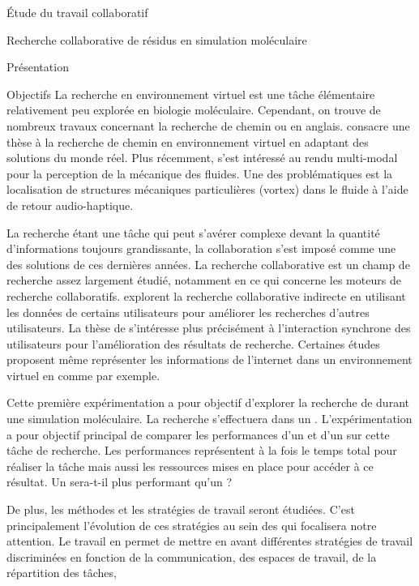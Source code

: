 \documentclass[myfrancais]{mythesis}
\begin{document}
\begin{mypart}{Étude du travail collaboratif}
\begin{mychapter}{Recherche collaborative de résidus en simulation moléculaire}
\begin{mysection}{Présentation}
\begin{mysubsection}{Objectifs}
					La recherche en environnement virtuel est une tâche élémentaire relativement peu explorée en biologie moléculaire.
					Cependant, on trouve de nombreux travaux concernant la \og recherche de chemin \fg ou  en anglais.
					 consacre une thèse à la recherche de chemin en environnement virtuel en adaptant des solutions du monde réel.
					Plus récemment,  s'est intéressé au rendu multi-modal pour la perception de la mécanique des fluides.
					Une des problématiques est la localisation de structures mécaniques particulières (vortex) dans le fluide à l'aide de retour audio-haptique.

					La recherche étant une tâche qui peut s'avérer complexe devant la quantité d'informations toujours grandissante, la collaboration s'est imposé comme une des solutions de ces dernières années.
					La recherche collaborative est un champ de recherche assez largement étudié, notamment en ce qui concerne les moteurs de recherche collaboratifs.
					 explorent la recherche collaborative indirecte en utilisant les données de certains utilisateurs pour améliorer les recherches d'autres utilisateurs.
					La thèse de  s'intéresse plus précisément à l'interaction synchrone des utilisateurs pour l'amélioration des résultats de recherche.
					Certaines études proposent même représenter les informations de l'internet dans un environnement virtuel en \myThreeD comme  par exemple.

					Cette première expérimentation a pour objectif d'explorer la recherche de  durant une simulation moléculaire.
					La recherche s'effectuera dans un .
					L'expérimentation a pour objectif principal de comparer les performances d'un  et d'un  sur cette tâche de recherche.
					Les performances représentent à la fois le temps total pour réaliser la tâche mais aussi les ressources mises en place pour accéder à ce résultat.
					Un  sera-t-il plus performant qu'un  ?

					De plus, les méthodes et les stratégies de travail seront étudiées.
					C'est principalement l'évolution de ces stratégies au sein des  qui focalisera notre attention.
					Le travail en  permet de mettre en avant différentes stratégies de travail discriminées en fonction de la communication, des espaces de travail, de la répartition des tâches, \myetc


\end{mysubsection}
\end{mysection}
\end{mychapter}
\end{mypart}
\end{document}
